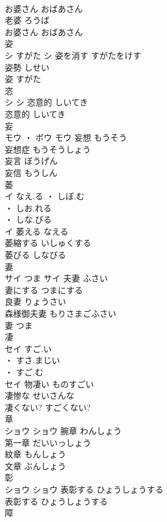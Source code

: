 \documentclass[8pt]{extreport}
\begin{document}
\begin{CJK}{UTF8}{min}
\\	お婆さん	おばあさん	
\\	老婆	ろうば	
\\	お婆さん	おばあさん	
\\	姿	
\\	シ	すがた	シ	姿を消す	すがたをけす	
\\	姿勢	しせい	
\\	姿	すがた	
\\	恣	
\\	シ		シ	恣意的	しいてき	
\\	恣意的	しいてき	
\\	妄	
\\	モウ ・ ボウ		モウ	妄想	もうそう	
\\	妄想症	もうそうしょう	
\\	妄言	ぼうげん	
\\	妄信	もうしん	
\\	萎	
\\	イ	なえ.る ・ しぼ.む
\\	・ しお.れる
\\	・ しな.びる
\\	イ	萎える	なえる	
\\	萎縮する	いしゅくする	
\\	萎びる	しなびる	
\\	妻	
\\	サイ	つま	サイ	夫妻	ふさい	
\\	妻にする	つまにする	
\\	良妻	りょうさい	
\\	森様御夫妻	もりさまごふさい	
\\	妻	つま	
\\	凄	
\\	セイ	すご.い
\\	・ すさ.まじい
\\	・ すご.む
\\	セイ	物凄い	ものすごい	
\\	凄惨な	せいさんな	
\\	凄くない?	すごくない?	
\\	章	
\\	ショウ		ショウ	腕章	わんしょう	
\\	第一章	だいいっしょう	
\\	紋章	もんしょう	
\\	文章	ぶんしょう	
\\	彰	
\\	ショウ		ショウ	表彰する	ひょうしょうする	
\\	表彰する	ひょうしょうする	
\\	障	

\end{CJK}
\end{document}
